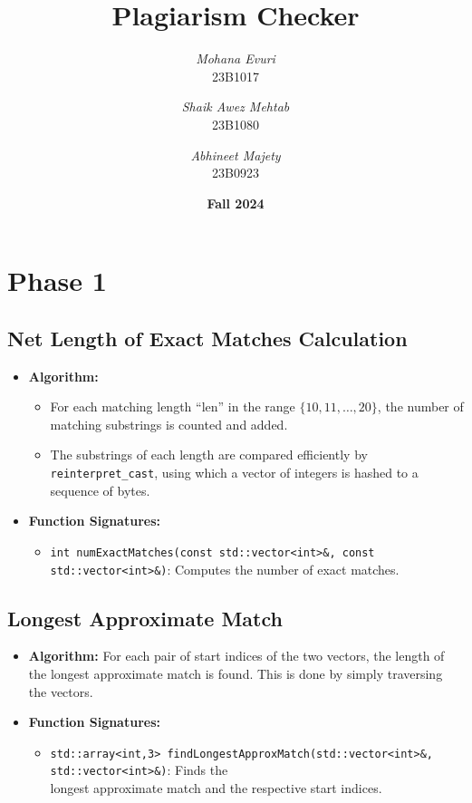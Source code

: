 \documentclass[11pt]{article}
\title{\textbf{Plagiarism Checker}}
\author{
    \textit{Mohana Evuri} \\
    23B1017
    \and
    \textit{Shaik Awez Mehtab} \\
    23B1080
    \and
    \textit{Abhineet Majety} \\
    23B0923
    \\[10pt]
}
\date{\Large \textbf{Fall 2024}}
\let\oldtexttt\texttt
\def\texttt#1{{\color{RoyalBlue}\oldtexttt{#1}}}
\begin{document}
\maketitle

\section{Phase 1}

\subsection{Net Length of Exact Matches Calculation}
\begin{itemize}[noitemsep]
    \item \textbf{Algorithm:} 
    \begin{itemize}
        \item For each matching length ``len'' in the range $\{10, 11, \ldots, 20\}$, the number of matching substrings is counted and added.
        \item The substrings of each length are compared efficiently by \texttt{reinterpret\_cast}, using which a vector of integers is hashed to a sequence of bytes.
    \end{itemize} 
    \item \textbf{Function Signatures:} 
    \begin{itemize}
        \item \texttt{int numExactMatches(const std::vector<int>\&, const std::vector<int>\&)}: Computes the number of exact matches.
    \end{itemize}
\end{itemize}

\subsection{Longest Approximate Match}
\begin{itemize}[noitemsep]
    \item \textbf{Algorithm:} For each pair of start indices of the two vectors, the length of the longest approximate match is found. This is done by simply traversing the vectors. 
    \item \textbf{Function Signatures:}
    \begin{itemize}
        \item \texttt{std::array<int,3> findLongestApproxMatch(std::vector<int>\&, std::vector<int>\&)}: Finds the \\ longest approximate match and the respective start indices.
    \end{itemize}
\end{itemize}
\end{document}
